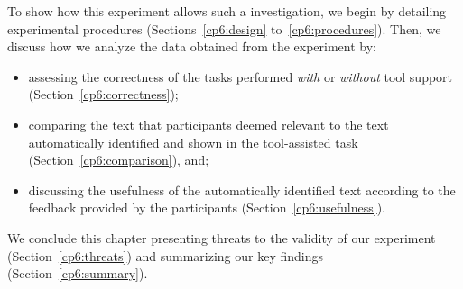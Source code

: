 To show how this experiment allows such a investigation, we begin by detailing
experimental procedures (Sections~\ref{cp6:design} to~\ref{cp6:procedures}).
Then, we discuss how we analyze the data obtained from the experiment by:


\begin{itemize}
    \item assessing the correctness of the tasks performed \textit{with} or \textit{without} tool support (Section~\ref{cp6:correctness});
    \item comparing  the text that participants deemed relevant to the text automatically identified
    and shown in the tool-assisted task (Section~\ref{cp6:comparison}), and;
    \item discussing the usefulness of the automatically identified text according to the feedback provided by the participants (Section~\ref{cp6:usefulness}).
\end{itemize}
 
We conclude this chapter presenting threats to the validity of our experiment (Section~\ref{cp6:threats}) and 
 summarizing our key findings (Section~\ref{cp6:summary}).












































